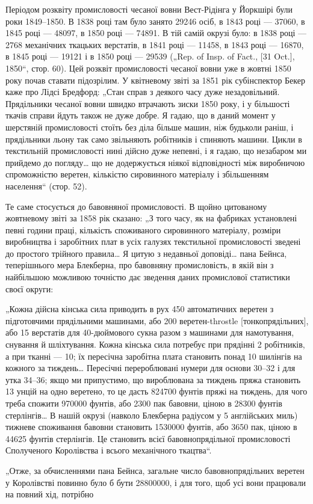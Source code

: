 
Періодом розквіту промисловості чесаної вовни Вест-Рідінга
у Йоркшірі були роки 1849--1850. В 1838 році там було занято
\num{29246} осіб, в 1843 році — \num{37060}, в 1845 році — \num{48097}, в 1850 році —
\num{74891}. В тій самій окрузі було: в 1838 році — 2768 механічних
ткацьких верстатів, в 1841 році — \num{11458}, в 1843 році — \num{16870},
в 1845 році — \num{19121} і в 1850 році — \num{29539} („Rep. of Insp. of Fact.,
[31 Oct.], 1850“, стор. 60). Цей розквіт промисловості чесаної
вовни уже в жовтні 1850 року почав ставати підозрілим. У квітневому
звіті за 1851 рік субінспектор Бекер каже про Лідсі Бредфорд:
„Стан справ з деякого часу дуже незадовільний. Прядільники
чесаної вовни швидко втрачають зиски 1850 року, і у більшості
ткачів справи йдуть також не дуже добре. Я гадаю, що
в даний момент у шерстяній промисловості стоїть без діла більше
машин, ніж будьколи раніш, і прядільники льону так само звільняють
робітників і спиняють машини. Цикли в текстильній промисловості
нині дійсно дуже непевні, і я гадаю, що незабаром
ми прийдемо до погляду\dots{} що не додержується ніякої відповідності
між виробничою спроможністю веретен, кількістю сировинного
матеріалу і збільшенням населення“ (стор. 52).

Те саме стосується до бавовняної промисловості. В щойно
цитованому жовтневому звіті за 1858 рік сказано: „З того часу,
як на фабриках установлені певні години праці, кількість споживаного
сировинного матеріалу, розміри виробництва і заробітних
плат в усіх галузях текстильної промисловості зведені
до простого трійного правила\dots{} Я цитую з недавньої доповіді\dots{}
пана Бейнса, теперішнього мера Блекберна, про бавовняну промисловість,
в якій він з найбільшою можливою точністю дає
зведення даних промислової статистики своєї округи:

„Кожна дійсна кінська сила приводить в рух 450 автоматичних
веретен з підготовчими прядільними машинами, або 200 веретен-throstle
[тонкопрядільних], або 15 верстатів для 40-дюймового
сукна разом з машинами для намотування, снування й
шліхтування. Кожна кінська сила потребує при прядінні 2 робітників,
а при тканні — 10; їх пересічна заробітна плата становить
понад 10  шилінгів на кожного за тиждень\dots{} Пересічні
перероблювані нумери для основи 30--32 і для утка 34--36;
якщо ми припустимо, що вироблювана за тиждень пряжа становить
13 унцій на одно веретено, то це дасть \num{824700} фунтів
пряжі на тиждень, для чого треба спожити \num{970000} фунтів, або
2300 пак бавовни, ціною в \num{28300} фунтів стерлінгів\dots{} В нашій
окрузі (навколо Блекберна радіусом у 5 англійських миль)
тижневе споживання бавовни становить \num{1530000} фунтів, або
3650 пак, ціною в \num{44625} фунтів стерлінгів. Це становить 
всієї бавовнопрядільної промисловості Сполученого Королівства
і   всього механічного ткацтва“.

„Отже, за обчисленнями пана Бейнса, загальне число бавовнопрядільних
веретен у Королівстві повинно було б бути \num{28800000},
і для того, щоб усі вони працювали на повний хід, потрібно
\parbreak{}  %
